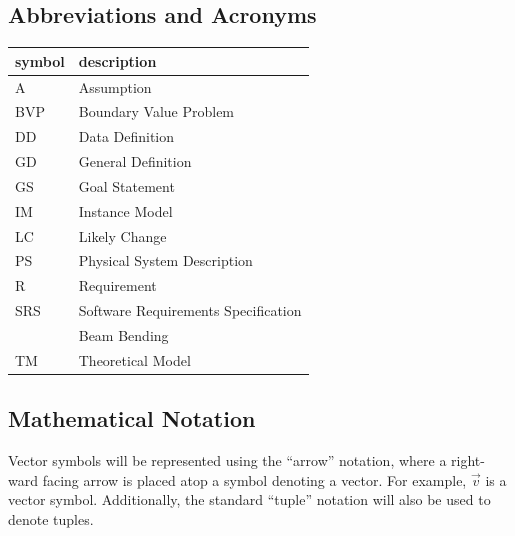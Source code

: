 \documentclass[12pt]{article}
\begin{document}
\subsection{Abbreviations and Acronyms}

\renewcommand{\arraystretch}{1.2}

\begin{center}
    \begin{tabular}{l l}
        \toprule
        \textbf{symbol} & \textbf{description}                \\
        \midrule
        A               & Assumption                          \\
        BVP             & Boundary Value Problem              \\
        DD              & Data Definition                     \\
        GD              & General Definition                  \\
        GS              & Goal Statement                      \\
        IM              & Instance Model                      \\
        LC              & Likely Change                       \\
        PS              & Physical System Description         \\
        R               & Requirement                         \\
        SRS             & Software Requirements Specification \\
        \progname{}     & Beam Bending                        \\
        TM              & Theoretical Model                   \\
        \bottomrule
    \end{tabular}
\end{center}

\subsection{Mathematical Notation}

Vector symbols will be represented using the ``arrow'' notation, where a
right-ward facing arrow is placed atop a symbol denoting a vector. For example,
\(\vec{v}\) is a vector symbol. Additionally, the standard ``tuple'' notation
will also be used to denote tuples.

\newpage
\end{document}
